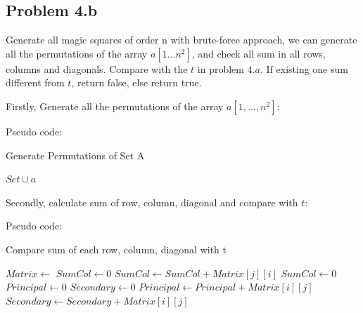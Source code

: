 \documentclass[a4paper]{article}
\begin{document}
\subsection{Problem 4.b}
Generate all magic squares of order n with brute-force approach, we can generate all the permutations of the array $a[1 \ldots n^2]$, and check all sum in all rows, columns and diagonals. Compare with the $t$ in problem $4.a$. If existing one sum different from $t$, return false, else return true. \par
Firstly, Generate all the permutations of the array $a[1, \ldots, n^2]:$ \par
Pseudo code: \par
\begin{algorithm}
\renewcommand{\thealgorithm}{1}
    \caption{Generate Permutations of Set A}
    
    \begin{algorithmic}[1]
     
            \State $Set \cup a$ 
        \Else
            \State {}
            \State {}
            \State {}
            \EndFor
        \EndIf
    \EndProcedure
        
    \end{algorithmic}

\end{algorithm}
Secondly, calculate sum of row, column, diagonal and compare with $t$: \par
Pseudo code: \par
\begin{algorithm}
\renewcommand{\thealgorithm}{2}
\caption{Compare sum of each row, column, diagonal with t}
\begin{algorithmic}
    \State $Matrix \gets$ 
     
        \State {}
        \EndIf
    \EndFor
    \State
    \State $SumCol \gets 0$
     
            \State $SumCol \gets SumCol+Matrix[j][i]$
        \EndFor
            \State {}
        \EndIf
        \State $SumCol \gets 0$
    \EndFor
    \State
    \State $Principal \gets 0$
    \State $Secondary \gets 0$
     
                \State $Principal \gets Principal + Matrix[i][j]$
            \EndIf
                \State $Secondary \gets Secondary + Matrix[i][j]$
            \EndIf
        \EndFor
    \EndFor
    \State {}
    \EndIf
    \State {}
\EndProcedure
\end{algorithmic}
\end{algorithm}
\end{document}
